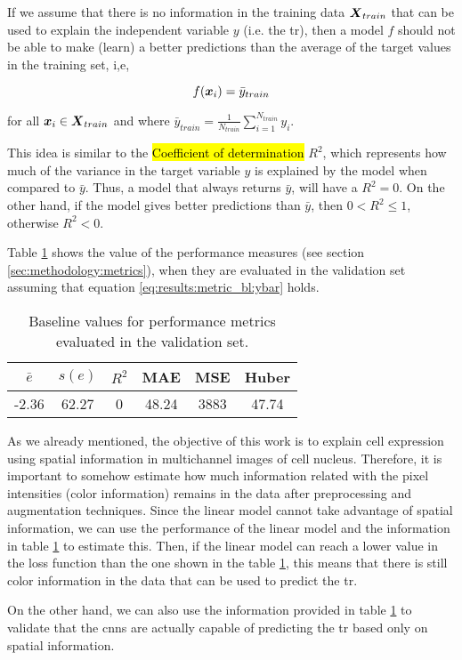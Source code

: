 

\graphicspath{{./Sections/Results/Resources/}}

If we assume that there is no information in the training data $\boldsymbol{X}_{train}$ that can be used to explain the independent variable $y$ (i.e. the \gls{tr}), then a model $f$ should not be able to make (learn) a better predictions than the average of the target values in the training set, i,e,

\begin{equation}
  f(\boldsymbol{x}_i)=\bar{y}_{train}
  \label{eq:results:metric_bl:ybar}
\end{equation}

\noindent for all $\boldsymbol{x}_i \in \boldsymbol{X}_{train}$ and where $\bar{y}_{train}=\frac{1}{N_{train}}\sum_{i=1}^{N_{train}}y_i$.

This idea is similar to the \hl{Coefficient of determination} $R^2$, which represents how much of the variance in the target variable $y$ is explained by the model when compared to $\bar{y}$.
Thus, a model that always returns $\bar{y}$, will have a $R^2=0$. On the other hand, if the model gives better predictions than $\bar{y}$, then $0 < R^2 \leq 1$, otherwise $R^2 < 0$.

Table \ref{table:results:metric_bl_vals} shows the value of the performance measures (see section \ref{sec:methodology:metrics}), when they are evaluated in the validation set assuming that equation \ref{eq:results:metric_bl:ybar} holds.

\begin{table}[!ht]
  \centering
  \begin{tabular}{c|c|c|c|c|c}
    \hline
    $\bar{e}$ & $s(e)$ & $R^2$ & MAE & MSE & Huber \\
    \hline
     -2.36 & 62.27 & 0 & 48.24 & 3883 & 47.74 \\
    \hline
  \end{tabular}
  \caption{Baseline values for performance metrics evaluated in the validation set.}
  \label{table:results:metric_bl_vals}
\end{table}

As we already mentioned, the objective of this work is to explain cell expression using spatial information in multichannel images of cell nucleus.
Therefore, it is important to somehow estimate how much information related with the pixel intensities (color information) remains in the data after preprocessing and augmentation techniques.
Since the linear model cannot take advantage of spatial information, we can use the performance of the linear model and the information in table \ref{table:results:metric_bl_vals} to estimate this.
Then, if the linear model can reach a lower value in the loss function than the one shown in the table \ref{table:results:metric_bl_vals}, this means that there is still color information in the data that can be used to predict the \gls{tr}.

On the other hand, we can also use the information provided in table \ref{table:results:metric_bl_vals} to validate that the \glspl{cnn} are actually capable of predicting the \gls{tr} based only on spatial information.
